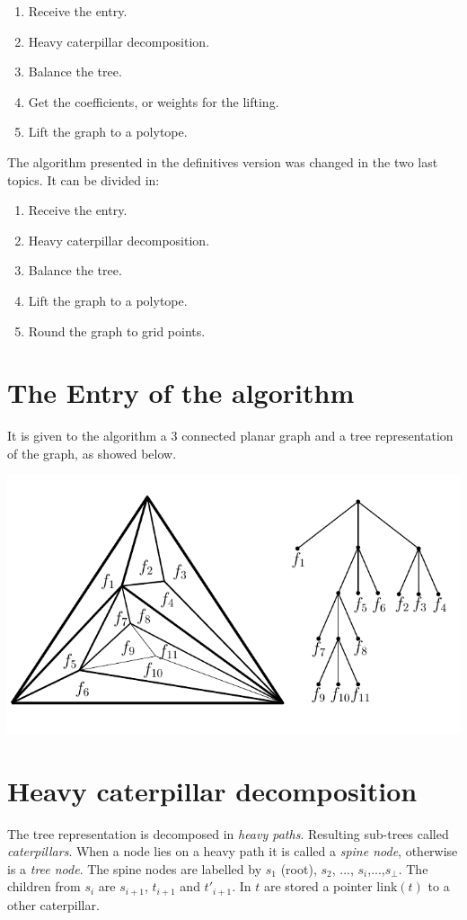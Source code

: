 \documentclass[10pt,a4paper]{article}
\begin{document}
\begin{enumerate}
\item Receive the entry.
\item Heavy caterpillar decomposition.
\item Balance the tree.
\item Get the coefficients, or weights for the lifting.
\item Lift the graph to a polytope. 
\end{enumerate}

The algorithm presented in the definitives version was changed in the two last topics. It can be divided in:

\begin{enumerate}
\item Receive the entry.
\item Heavy caterpillar decomposition.
\item Balance the tree.
\item Lift the graph to a polytope. 
\item Round the graph to grid points.
\end{enumerate}
 

\section{The Entry of the algorithm}

It is given to the algorithm a 3 connected planar graph and a tree representation of the graph, as showed below.

\includegraphics[scale=0.8]{graph_tree.png} 

\section{Heavy caterpillar decomposition}
The tree representation is decomposed in \textit{heavy paths}. Resulting sub-trees called \textit{caterpillars}. When a node lies on a heavy path it is called a \textit{spine node}, otherwise is a \textit{tree node}. The spine nodes are labelled by $s_1$ (root), $s_2$, ..., $s_i$,...,$s_\bot$. The children from $s_i$ are $s_{i+1}$, $t_{i+1}$ and $t'_{i+1}$. In $t$ are stored a pointer link$(t)$ to a other caterpillar. 
\end{document}
